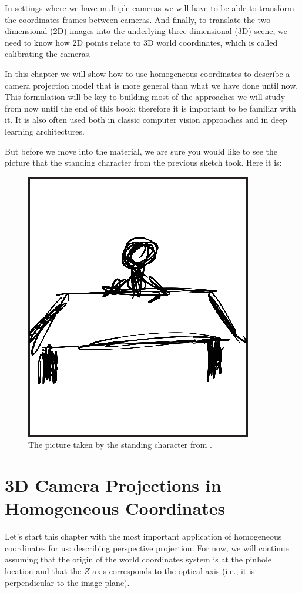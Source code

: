 In settings where we have multiple cameras we will have to be able to transform the coordinates frames between cameras. And finally, to translate the two-dimensional (2D) images into the underlying three-dimensional (3D) scene, we need to know how 2D points relate to 3D world coordinates, which is called calibrating the cameras.
 
In this chapter we will show how to use homogeneous coordinates to describe a camera projection model that is more general than what we have done until now. This formulation will be key to building most of the approaches we will study from now until the end of this book; therefore it is important to be familiar with it. It is also often used both in classic computer vision approaches and in deep learning architectures. 

But before we move into the material, we are sure you would like to see the picture that the standing character from the previous sketch took. Here it is:

\begin{figure}[h]
\centerline{
\includegraphics[width=.25\linewidth]{figures/imaging_geometry/the_picture.eps}
}
\caption{The picture taken by the standing character from \fig{\ref{fig:world_and_camera_coordinates}}.}
\end{figure}


\section{3D Camera Projections in Homogeneous Coordinates}

Let's start this chapter with the most important application of homogeneous coordinates for us: describing perspective projection. For now, we will continue assuming that the origin of the world coordinates system is at the pinhole location and that the $Z$-axis corresponds to the optical axis (i.e., it is perpendicular to the image plane).



